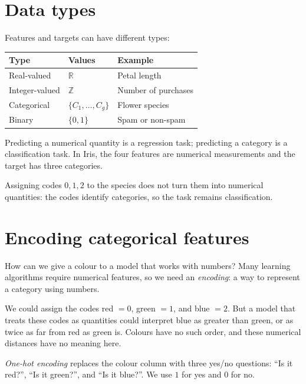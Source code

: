 \documentclass[a4paper,12pt,oneside]{report}
\begin{document}
\section{Data types}

Features and targets can have different types:
\begin{center}
\begin{tabularx}{\linewidth}{@{}llX@{}}
\toprule
\textbf{Type} & \textbf{Values} & \textbf{Example} \\
\midrule
Real-valued & $\mathbb{R}$ & Petal length \\
Integer-valued & $\mathbb{Z}$ & Number of purchases \\
Categorical & $\{C_1,\ldots,C_g\}$ & Flower species \\
Binary & $\{0,1\}$ & Spam or non-spam \\
\bottomrule
\end{tabularx}
\end{center}

Predicting a numerical quantity is a regression task; predicting a
category is a classification task. In Iris, the four features are
numerical measurements and the target has three categories.

Assigning codes $0,1,2$ to the species does not turn them into numerical
quantities: the codes identify categories, so the task remains
classification.

\clearpage
\section{Encoding categorical features}

How can we give a colour to a model that works with numbers? Many learning
algorithms require numerical features, so we need an \emph{encoding}: a
way to represent a category using numbers.

We could assign the codes red $=0$, green $=1$, and blue $=2$. But a model
that treats these codes as quantities could interpret blue as greater
than green, or as twice as far from red as green is. Colours have no
such order, and these numerical distances have no meaning here.

\emph{One-hot encoding} replaces the colour column with three yes/no
questions: ``Is it red?'', ``Is it green?'', and ``Is it blue?''.
We use $1$ for yes and $0$ for no.
\end{document}
